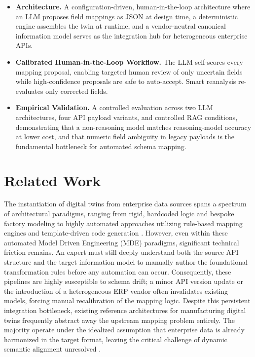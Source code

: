 \documentclass[3p,times,procedia]{elsarticle}
\begin{document}
\begin{itemize}
\item \textbf{Architecture.} A configuration-driven, human-in-the-loop architecture where an LLM proposes field mappings as JSON at design time, a deterministic engine assembles the twin at runtime, and a vendor-neutral canonical information model serves as the integration hub for heterogeneous enterprise APIs.
\item \textbf{Calibrated Human-in-the-Loop Workflow.} The LLM self-scores every mapping proposal, enabling targeted human review of only uncertain fields while high-confidence proposals are safe to auto-accept. Smart reanalysis re-evaluates only corrected fields.
\item \textbf{Empirical Validation.} A controlled evaluation across two LLM architectures, four API payload variants, and controlled RAG conditions, demonstrating that a non-reasoning model matches reasoning-model accuracy at lower cost, and that numeric field ambiguity in legacy payloads is the fundamental bottleneck for automated schema mapping.
\end{itemize}

\section{Related Work}
\label{sec:related}

The instantiation of digital twins from enterprise data sources spans a spectrum of architectural paradigms, ranging from rigid, hardcoded logic and bespoke factory modeling \cite{Jia2022From,Lugaresi2021Automated} to highly automated approaches utilizing rule-based mapping engines and template-driven code generation \cite{Lehner2025Model-driven,Schroeder2021A}. However, even within these automated Model Driven Engineering (MDE) paradigms, significant technical friction remains. An expert must still deeply understand both the source API structure and the target information model to manually author the foundational transformation rules before any automation can occur. Consequently, these pipelines are highly susceptible to schema drift; a minor API version update or the introduction of a heterogeneous ERP vendor often invalidates existing models, forcing manual recalibration of the mapping logic. Despite this persistent integration bottleneck, existing reference architectures for manufacturing digital twins \cite{inbook,ZVEI2015RAMI40,iso23247-1} frequently abstract away the upstream mapping problem entirely. The majority operate under the idealized assumption that enterprise data is already harmonized in the target format, leaving the critical challenge of dynamic semantic alignment unresolved \cite{Hildebrandt2024Data,Jeddoub2024Data}.
\end{document}
